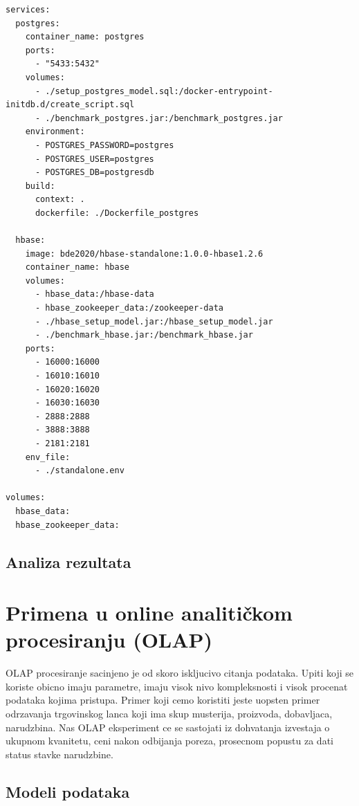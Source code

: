 \documentclass[12pt,oneside]{memoir}
\begin{document}

\begin{lstlisting}[title={docker-compose.yml},captionpos=t]
services: 
  postgres:
    container_name: postgres
    ports:
      - "5433:5432"
    volumes:
      - ./setup_postgres_model.sql:/docker-entrypoint-initdb.d/create_script.sql
      - ./benchmark_postgres.jar:/benchmark_postgres.jar
    environment:
      - POSTGRES_PASSWORD=postgres
      - POSTGRES_USER=postgres
      - POSTGRES_DB=postgresdb
    build:
      context: .
      dockerfile: ./Dockerfile_postgres

  hbase:
    image: bde2020/hbase-standalone:1.0.0-hbase1.2.6
    container_name: hbase
    volumes:
      - hbase_data:/hbase-data
      - hbase_zookeeper_data:/zookeeper-data
      - ./hbase_setup_model.jar:/hbase_setup_model.jar
      - ./benchmark_hbase.jar:/benchmark_hbase.jar
    ports:
      - 16000:16000
      - 16010:16010
      - 16020:16020
      - 16030:16030
      - 2888:2888
      - 3888:3888
      - 2181:2181
    env_file:
      - ./standalone.env

volumes:
  hbase_data:
  hbase_zookeeper_data:
\end{lstlisting}


\subsection{Analiza rezultata}

\section{Primena u online analitičkom procesiranju (OLAP)}

OLAP procesiranje sacinjeno je od skoro iskljucivo citanja podataka. Upiti koji se koriste obicno imaju parametre, imaju visok nivo kompleksnosti i visok procenat podataka kojima pristupa.
Primer koji cemo koristiti jeste uopsten primer odrzavanja trgovinskog lanca koji ima skup musterija, proizvoda, dobavljaca,  narudzbina. 
Nas OLAP eksperiment ce se sastojati iz dohvatanja izvestaja o ukupnom kvanitetu, ceni nakon odbijanja poreza, prosecnom popustu za dati status stavke narudzbine.

\subsection{Modeli podataka}
\end{document}
